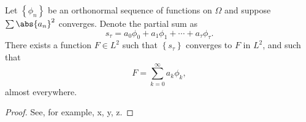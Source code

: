 % 

\begin{thm}

Let $\left\{ \phi_{n} \right\}$ be an orthonormal sequence of functions on $\Omega$ and suppose $\sum \abs{a_{n}}^{2}$ converges. Denote the partial sum as
%
\begin{equation*}
	s_{\tau} = a_{0}\phi_{0} + a_{1}\phi_{1} + \cdots + a_{\tau}\phi_{\tau} .
\end{equation*}
%
There exists a function $F\in L^{2}$ such that $\left\{ s_{\tau} \right\}$ converges to $F$ in $L^{2}$, and such that
%
\begin{equation*}
	F = \sum_{k=0}^{\infty} a_{k}\phi_{k},
\end{equation*}
%
almost everywhere.

\label{thm:RieszFischer}
\end{thm}
%
\begin{proof}
	See, for example, x, y, z.
\end{proof}


\endinput  %
